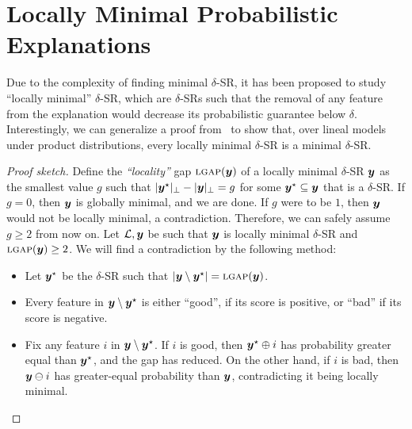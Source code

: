 \section{Locally Minimal Probabilistic Explanations}

Due to the complexity of finding minimal $\delta$-SR, it has been proposed to study ``locally minimal'' $\delta$-SR, which are $\delta$-SRs such that the removal of any feature from the explanation would decrease its probabilistic guarantee below $\delta$.
Interestingly, we can generalize a proof from~\cite{Arenas_Barcelo_Romero_Subercaseaux_2022} to show that, over lineal models under product distributions, every locally minimal $\delta$-SR is a minimal $\delta$-SR.

\begin{proof}[Proof sketch]
    Define the \emph{``locality''} gap $\textsc{lgap}({\bm{y}})$ of a locally minimal $\delta$-SR ${\bm{y}}$ as the smallest value $g$ such that $|{\bm{y}}^\star|_\bot - |{\bm{y}}|_\bot = g$ for some ${\bm{y}}^\star \subseteq {\bm{y}}$ that is a $\delta$-SR.
    If $g = 0$, then ${\bm{y}}$ is globally minimal, and we are done. If $g$ were to be $1$, then ${\bm{y}}$ would not be locally minimal, a contradiction. Therefore, we can safely assume $g \geq 2$ from now on.
    Let $\mathcal{L}, {\bm{y}}$ be such that ${\bm{y}}$ is locally minimal $\delta$-SR and $\textsc{lgap}({\bm{y}}) \geq 2$. We will find a contradiction by the following method:
    \begin{itemize}
        \item Let ${\bm{y}}^\star$ be the $\delta$-SR such that $| {\bm{y}} \setminus {\bm{y}}^\star | = \textsc{lgap}({\bm{y}})$.
        \item Every feature in ${\bm{y}} \setminus {\bm{y}}^\star$ is either ``good'', if its score is positive, or ``bad'' if its score is negative.
        \item Fix any feature $i$ in ${\bm{y}} \setminus {\bm{y}}^\star$. If $i$ is good, then ${\bm{y}}^\star \oplus i$ has probability greater equal than ${\bm{y}}^\star$, and the gap has reduced.
                On the other hand, if $i$ is bad, then ${\bm{y}} \ominus i$ has greater-equal probability than ${\bm{y}}$, contradicting it being locally minimal.
    \end{itemize}


\end{proof}